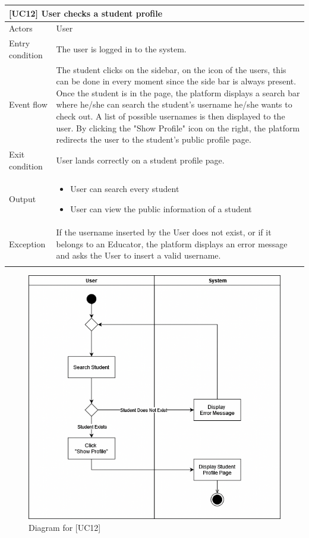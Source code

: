 \documentclass[12pt,oneside,a4paper]{article}
\begin{document}
\begin{table}[htbp]
\begin{tabular}{|l|p{12cm}|}
    \hline
    \multicolumn{2}{|l|}{\textbf{[UC12] User checks a student profile}}\\
    \hline
    Actors & User\\
    \hline
    Entry condition & The user is logged in to the system.\\
    \hline
    Event flow & The student clicks on the sidebar, on the icon of the users, this can be done in every moment since the side bar is always present. Once the student is in the page, the platform displays a search bar where he/she can search the student's username he/she wants to check out. A list of possible usernames is then displayed to the user. By clicking the "Show Profile" icon on the right, the platform redirects the user to the student's public profile page.\\
    \hline
    Exit condition & User lands correctly on a student profile page.\\
    \hline
    Output & \begin{itemize}
        \item User can search every student
        \item User can view the public information of a student
    \end{itemize}\\
    \hline
    Exception & If the username inserted by the User does not exist, or if it belongs to an Educator, the platform displays an error message and asks the User to insert a valid username.\\
    \lasthline
\end{tabular}
\end{table}

\clearpage

\begin{figure}[htbp]
    \centering
    \includegraphics[width=1\linewidth]{Images/Diagrams/CheckProfile.png}
    \caption{Diagram for [UC12]}
    \label{fig:enter-label}
\end{figure}
\end{document}
